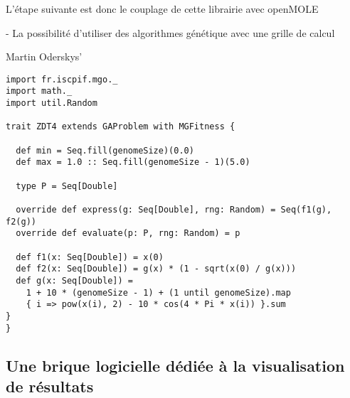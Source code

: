 L'étape suivante est donc le couplage de cette librairie avec openMOLE 


- La possibilité d'utiliser des algorithmes génétique avec une grille de calcul


Martin Oderskys’


\begin{verbatim}
import fr.iscpif.mgo._
import math._
import util.Random

trait ZDT4 extends GAProblem with MGFitness {

  def min = Seq.fill(genomeSize)(0.0)
  def max = 1.0 :: Seq.fill(genomeSize - 1)(5.0)

  type P = Seq[Double]

  override def express(g: Seq[Double], rng: Random) = Seq(f1(g), f2(g))
  override def evaluate(p: P, rng: Random) = p

  def f1(x: Seq[Double]) = x(0)
  def f2(x: Seq[Double]) = g(x) * (1 - sqrt(x(0) / g(x)))
  def g(x: Seq[Double]) =
    1 + 10 * (genomeSize - 1) + (1 until genomeSize).map 
    { i => pow(x(i), 2) - 10 * cos(4 * Pi * x(i)) }.sum
}
}
\end{verbatim}

\subsection{Une brique logicielle dédiée à la visualisation de résultats}


